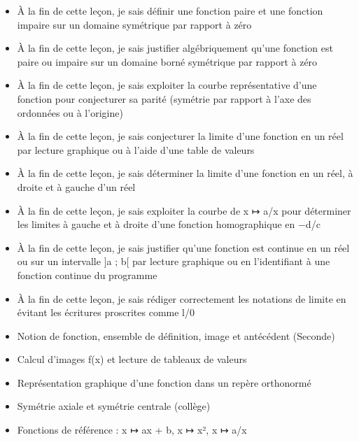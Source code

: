 \documentclass[11pt]{article}
\begin{document}
\begin{objectifs}
\begin{itemize}
\item À la fin de cette leçon, je sais définir une fonction paire et une fonction impaire sur un domaine symétrique par rapport à zéro
\item À la fin de cette leçon, je sais justifier algébriquement qu'une fonction est paire ou impaire sur un domaine borné symétrique par rapport à zéro
\item À la fin de cette leçon, je sais exploiter la courbe représentative d'une fonction pour conjecturer sa parité (symétrie par rapport à l'axe des ordonnées ou à l'origine)
\item À la fin de cette leçon, je sais conjecturer la limite d'une fonction en un réel par lecture graphique ou à l'aide d'une table de valeurs
\item À la fin de cette leçon, je sais déterminer la limite d'une fonction en un réel, à droite et à gauche d'un réel
\item À la fin de cette leçon, je sais exploiter la courbe de x ↦ a/x pour déterminer les limites à gauche et à droite d'une fonction homographique en −d/c
\item À la fin de cette leçon, je sais justifier qu'une fonction est continue en un réel ou sur un intervalle ]a ; b[ par lecture graphique ou en l'identifiant à une fonction continue du programme
\item À la fin de cette leçon, je sais rédiger correctement les notations de limite en évitant les écritures proscrites comme l/0
\end{itemize}
\end{objectifs}

\begin{prerequis}
\begin{itemize}
\item Notion de fonction, ensemble de définition, image et antécédent (Seconde)
\item Calcul d'images f(x) et lecture de tableaux de valeurs
\item Représentation graphique d'une fonction dans un repère orthonormé
\item Symétrie axiale et symétrie centrale (collège)
\item Fonctions de référence : x ↦ ax + b, x ↦ x², x ↦ a/x
\end{itemize}
\end{prerequis}

\newpage
\end{document}
